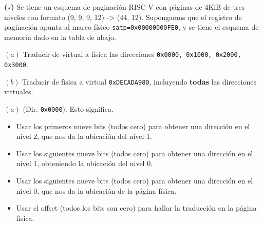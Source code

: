\documentclass[12pt]{article}
\theoremstyle{definition}
\begin{document}
\begin{shaded}
    \textbf{($\star$)} Se tiene un esquema de paginación RISC-V con páginas de
    4KiB de tres niveles con formato (9, 9, 9, 12) -> (44, 12). Supongaoms que
    el registro de paginación apunta al marco físico
    \texttt{satp=0x00000000FE0}, y se tiene el esquema de memoria dado en la
    tabla de abajo. 

    $(a)$ Traducir de virtual a física las direcciones \texttt{0x0000, 0x1000,
    0x2000, 0x3000}.

    $(b)$ Traducir de física a virtual \texttt{0xDECADA980}, incluyendo
    \textbf{todas} las direcciones virtuales.
\end{shaded}

\begin{table}[h!]
\centering
\renewcommand{\arraystretch}{1.2}
\end{table}

$(a)$ (Dir. \texttt{0x0000}). Esto significa.

\begin{itemize}
    \item Usar los primeros nueve bits (todos cero) para obtener una dirección
        en el nivel 2, que nos da la ubicación del nivel 1.
\item Usar los siguientes nueve bits (todos cero) para obtener una dirección en
    el nivel 1, obteniendo la ubicación del nivel 0. 
\item Usar los siguientes nueve bits (todos cero) para obtener una dirección en
    el nivel 0, que nos da la ubicación de la página física. 
\item  Usar el offset (todos los bits son cero) para hallar la traducción en la
    página física.
\end{itemize}
\end{document}
